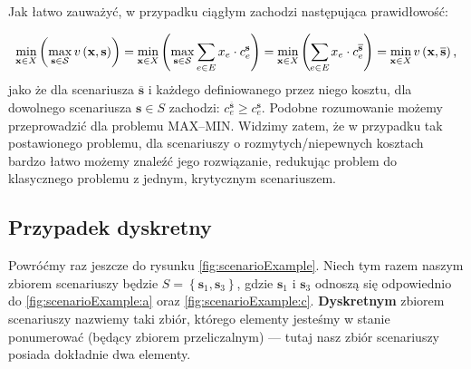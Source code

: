 Jak łatwo zauważyć, w przypadku ciągłym zachodzi następująca prawidłowość:

\begin{equation}
		\min_{ \mathclap{\textbf{x} \in X}} \left( \max_{ \mathclap{\textbf{s} \in \mathcal{S}}} v \left( \textbf{x}, \textbf{s} \right) \right) = \min_{ \mathclap{\textbf{x} \in X}} \left( \max_{ \mathclap{\textbf{s} \in \mathcal{S}}} \sum_{e \in E} x_{e} \cdot c^{\textbf{s}}_{e} \right) = \min_{ \mathclap{\textbf{x} \in X}} \left( \sum_{ \mathclap{e \in E}} x_{e} \cdot c^{\overline{\textbf{s}}}_{e} \right) = \min_{ \mathclap{\textbf{x} \in X}} v \left( \textbf{x}, \overline{\textbf{s}} \right) \text{,}
\end{equation}
jako że dla scenariusza $\overline{\textbf{s}}$ i każdego definiowanego przez niego kosztu, dla dowolnego scenariusza $\textbf{s} \in S$ zachodzi: $c^{\overline{\textbf{s}}}_{e} \geqslant c^{\textbf{s}}_{e}$. Podobne rozumowanie możemy przeprowadzić dla problemu \textsc{MAX--MIN}. Widzimy zatem, że w przypadku tak postawionego problemu, dla scenariuszy o rozmytych/niepewnych kosztach bardzo łatwo możemy znaleźć jego rozwiązanie, redukując problem do klasycznego problemu z jednym, krytycznym scenariuszem.

\subsection{Przypadek dyskretny}

Powróćmy raz jeszcze do rysunku \ref{fig:scenarioExample}. Niech tym razem naszym zbiorem scenariuszy będzie $S = \left\{ \textbf{s}_{1}, \textbf{s}_{3} \right\}$, gdzie $\textbf{s}_{1}$ i $\textbf{s}_{3}$ odnoszą się odpowiednio do \ref{fig:scenarioExample:a} oraz \ref{fig:scenarioExample:c}. \textbf{Dyskretnym} zbiorem scenariuszy nazwiemy taki zbiór, którego elementy jesteśmy w stanie ponumerować (będący zbiorem przeliczalnym) --- tutaj nasz zbiór scenariuszy posiada dokładnie dwa elementy.

